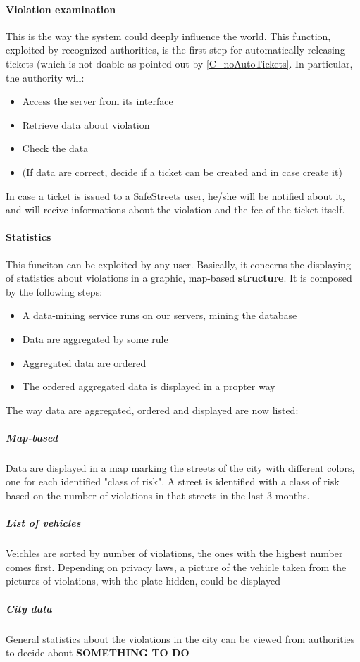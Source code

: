\documentclass{article}
\begin{document}
		\paragraph{Violation examination}
			This is the way the system could deeply influence the world. This function, exploited by recognized authorities, is the first step for automatically releasing tickets (which is not doable as pointed out by \ref{C_noAutoTickets}. In particular, the authority will:
			\begin{itemize}
				\item Access the server from its interface
				\item Retrieve data about violation
				\item Check the data
				\item (If data are correct, decide if a ticket can be created and in case create it)
			\end{itemize}
			In case a ticket is issued to a SafeStreets user, he/she will be notified about it, and will recive informations about the violation and the fee of the ticket itself.
		
		\paragraph{Statistics}
			This funciton can be exploited by any user. Basically, it concerns the displaying of statistics about violations in a graphic, map-based \textbf{structure}. It is composed by the following steps:
			\begin{itemize}
				\item A data-mining service runs on our servers, mining the database
				\item Data are aggregated by some rule
				\item Aggregated data are ordered
				\item The ordered aggregated data is displayed in a propter way
			\end{itemize}
			The way data are aggregated, ordered and displayed are now listed:
				\subparagraph{Map-based} Data are displayed in a map marking the streets of the city with different colors, one for each identified "class of risk". A street is identified with a class of risk based on the number of violations in that streets in the last 3 months.
				\subparagraph{List of vehicles} Veichles are sorted by number of violations, the ones with the highest number comes first. Depending on privacy laws, a picture of the vehicle taken from the pictures of violations, with the plate hidden, could be displayed
				\subparagraph{City data} General statistics about the violations in the city can be viewed from authorities to decide about \textbf{SOMETHING TO DO}
				
\end{document}
